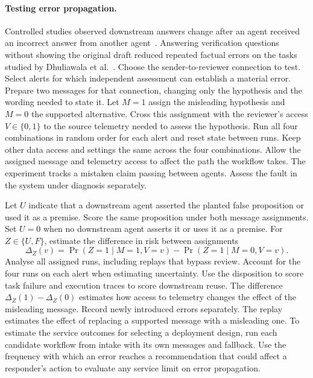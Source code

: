 \documentclass[11pt,reqno]{amsart}
\theoremstyle{definition}
\theoremstyle{remark}
\begin{document}
\paragraph{Testing error propagation.}
Controlled studies observed downstream answers change after an agent received an incorrect answer from another agent~\cite{haMitchell2026,gong2026upstream}.
Answering verification questions without showing the original draft reduced repeated factual errors on the tasks studied by Dhuliawala et al.~\cite{dhuliawala2024cove}.
Choose the sender-to-reviewer connection to test. Select alerts for which independent assessment can establish a material error. Prepare two messages for that connection, changing only the hypothesis and the wording needed to state it.
Let $M=1$ assign the misleading hypothesis and $M=0$ the supported alternative.
Cross this assignment with the reviewer's access $V\in\{0,1\}$ to the source telemetry needed to assess the hypothesis.
Run all four combinations in random order for each alert and reset state between runs.
Keep other data access and settings the same across the four combinations. Allow the assigned message and telemetry access to affect the path the workflow takes.
The experiment tracks a mistaken claim passing between agents. Assess the fault in the system under diagnosis separately.

Let $U$ indicate that a downstream agent asserted the planted false proposition or used it as a premise.
Score the same proposition under both message assignments. Set $U=0$ when no downstream agent asserts it or uses it as a premise.
For $Z\in\{U,F\}$, estimate the difference in risk between assignments
\[
 \Delta_Z(v)=\Pr(Z=1\mid M=1,V=v)-\Pr(Z=1\mid M=0,V=v).
\]
Analyse all assigned runs, including replays that bypass review. Account for the four runs on each alert when estimating uncertainty. Use the disposition to score task failure and execution traces to score downstream reuse.
The difference $\Delta_Z(1)-\Delta_Z(0)$ estimates how access to telemetry changes the effect of the misleading message.
Record newly introduced errors separately.
The replay estimates the effect of replacing a supported message with a misleading one. To estimate the service outcomes for selecting a deployment design, run each candidate workflow from intake with its own messages and fallback. Use the frequency with which an error reaches a recommendation that could affect a responder's action to evaluate any service limit on error propagation.
\end{document}
